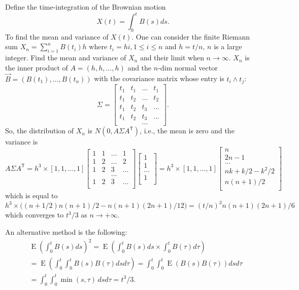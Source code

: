 \documentclass[  11pt]{article}
\newcommand{\optional}{ {\it optional} }
\newcommand{\e}{ \operatorname{E}}
\newcommand{\tr}{{\textsf{T}}}
\begin{document}
\begin{ExerciseList}
\Exercise[name=\optional, difficulty=3] 
Define  the time-integration of the Brownian motion 
\[ X(t)=\int_0^t B(s)ds.\]
To find the mean and variance of $X(t)$.
One can consider the finite  Riemann sum
$X_n=\sum_{i=1}^n B(t_i) h$
where  $t_i = h i,  1\leq i \leq n $ and $h=t/n$, $n$ is a large integer. 
Find the mean and variance of $X_n$ and their limit when $n\to \infty$.
\Answer
$X_n$ is the inner product of $A=(h,h,\ldots, h)$ and the $n$-dim
normal vector $\vec{B}=(B(t_1),\ldots, B(t_n))$ with the covariance matrix
whose entry is $t_i \wedge t_j$:
$$
\Sigma=\begin{bmatrix}
t_1 &t_1& \ldots& t_1 \\
t_1 &t_2& \ldots & t_2 \\
t_1 &t_2& t_3& \ldots \\
t_1 &t_2& t_3& \ldots\\
&&\ldots&
\end{bmatrix}.
$$
So, the distribution of $X_n$ is $N(0, A\Sigma A^\tr)$, i.e., the mean is zero
and the variance is 
$$
A\Sigma A^\tr=
h^3\times [1,1,\ldots, 1]\begin{bmatrix}
1 &1& \ldots&1 \\
1 &2& \ldots & 2 \\
1 &2& 3& \ldots \\
&&\ldots&\\
1 &2& 3& \ldots\\
\end{bmatrix}
\begin{bmatrix}
1   \\
1   \\
\ldots   \\
1\\
\end{bmatrix}
=
h^3\times [1,1,\ldots, 1]
\begin{bmatrix}
n   \\
2n-1   \\
\ldots\\
nk+k/2-k^2/2  \\
n(n+1)/2\\
\end{bmatrix}
$$
which is equal to 
$h^3 \times \bigg( (n+1/2) n(n+1)/2-  n(n+1)(2n+1)/12\bigg)=(t/n)^3n(n+1)(2n+1)/6$
which converges to $t^3/3$ as $n\to +\infty$.

An alternative method is the following:
\begin{equation*}
\begin{split}
&\e \left ( \int_0^t B(s)ds \right)^2
=\e \left ( \int_0^t B(s)ds  \times \int_0^t B(\tau)d\tau \right) 
\\
&=\e \left ( \int_0^t  \int_0^t B(s)   B(\tau)ds d\tau \right) 
= \int_0^t  \int_0^t \e \left ( B(s)   B(\tau) \right)  ds d\tau
\\
&= \int_0^t  \int_0^t   \min(s, \tau ) \, ds d\tau  =t^3/3.
\end{split}
\end{equation*}








\end{ExerciseList}
\end{document}
